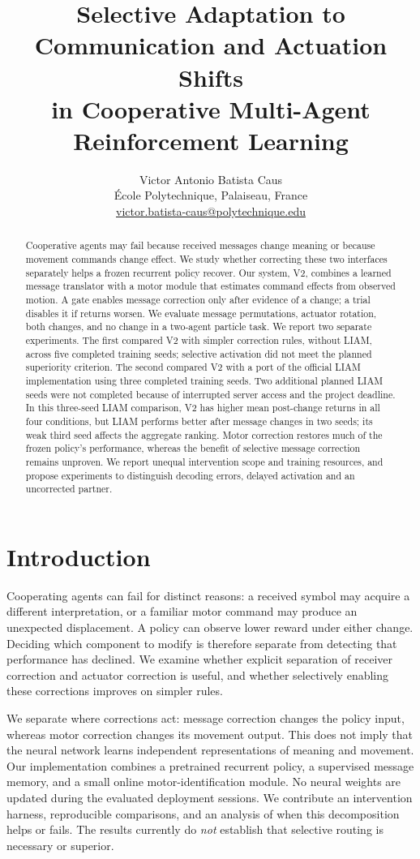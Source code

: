 \documentclass[10pt,a4paper]{article}
\title{Selective Adaptation to Communication and Actuation Shifts\\in Cooperative Multi-Agent Reinforcement Learning}
\author{Victor Antonio Batista Caus\\\small École Polytechnique, Palaiseau, France\\\small\href{mailto:victor.batista-caus@polytechnique.edu}{victor.batista-caus@polytechnique.edu}}
\date{}
\begin{document}
\maketitle
\begin{abstract}
Cooperative agents may fail because received messages change meaning or because movement commands change effect. We study whether correcting these two interfaces separately helps a frozen recurrent policy recover. Our system, V2, combines a learned message translator with a motor module that estimates command effects from observed motion. A gate enables message correction only after evidence of a change; a trial disables it if returns worsen. We evaluate message permutations, actuator rotation, both changes, and no change in a two-agent particle task. We report two separate experiments. The first compared V2 with simpler correction rules, without LIAM, across five completed training seeds; selective activation did not meet the planned superiority criterion. The second compared V2 with a port of the official LIAM implementation using three completed training seeds. Two additional planned LIAM seeds were not completed because of interrupted server access and the project deadline. In this three-seed LIAM comparison, V2 has higher mean post-change returns in all four conditions, but LIAM performs better after message changes in two seeds; its weak third seed affects the aggregate ranking. Motor correction restores much of the frozen policy's performance, whereas the benefit of selective message correction remains unproven. We report unequal intervention scope and training resources, and propose experiments to distinguish decoding errors, delayed activation and an uncorrected partner.
\end{abstract}

\section{Introduction}
Cooperating agents can fail for distinct reasons: a received symbol may acquire a different interpretation, or a familiar motor command may produce an unexpected displacement. A policy can observe lower reward under either change. Deciding which component to modify is therefore separate from detecting that performance has declined. We examine whether explicit separation of receiver correction and actuator correction is useful, and whether selectively enabling these corrections improves on simpler rules.

We separate where corrections act: message correction changes the policy input, whereas motor correction changes its movement output. This does not imply that the neural network learns independent representations of meaning and movement. Our implementation combines a pretrained recurrent policy, a supervised message memory, and a small online motor-identification module. No neural weights are updated during the evaluated deployment sessions. We contribute an intervention harness, reproducible comparisons, and an analysis of when this decomposition helps or fails. The results currently do \emph{not} establish that selective routing is necessary or superior.
\end{document}
